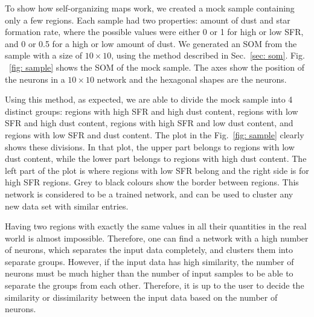 To show how self-organizing maps work, we created a mock sample containing only a few regions.
Each sample had two properties: amount of dust and star formation rate, where the possible values were
either 0 or 1 for high or low SFR, and 0 or 0.5 for a high or low amount of dust. %
 We generated an SOM from the sample with a size of $10 \times 10$, using the method described in Sec.~\ref{sec: som}.
 Fig. ~\ref{fig: sample} shows the SOM of the mock sample. 
 The axes show the position of the neurons in a $10 \times 10$ network and the hexagonal shapes are the neurons.
 
Using this method, as expected, we are able to divide the mock sample into 4 distinct groups: regions with high SFR and high dust content, regions with low SFR and high dust content, regions with high SFR and low dust content, and regions with low SFR and dust content. 
The plot in the Fig.~\ref{fig: sample} clearly shows these divisions.
In that plot, the upper part belongs to regions with low dust content, while the lower part belongs to regions with high dust content.
The left part of the plot is where regions with low SFR belong and the right side is for high SFR regions.
Grey to black colours show the border between regions.
This network is considered to be a trained network, and can be used to cluster any new data set with similar entries.

Having two regions with exactly the same values in all their quantities in the real world is almost impossible. 
Therefore, one can find a network with a high number of neurons, which separates the input data completely, and clusters them into separate groups.
However, if the input data has high similarity, the number of neurons must be much higher than the number of input samples to be able to separate the groups from each other. 
Therefore, it is up to the user to decide the similarity or dissimilarity between the input data based on the number of neurons.  %

